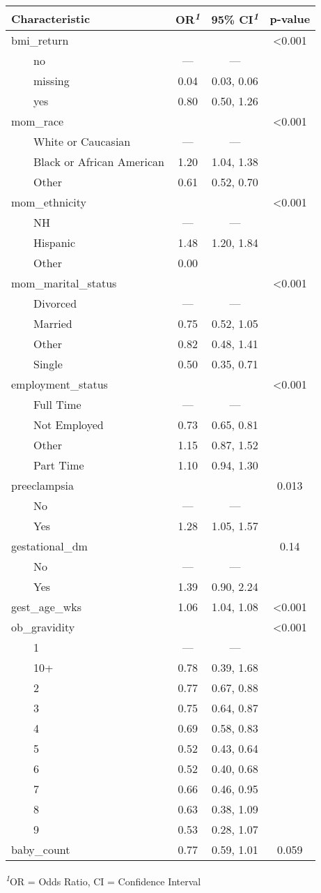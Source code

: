 \setlength{\LTpost}{0mm}
\begin{longtable}{lccc}
\toprule
\textbf{Characteristic} & \textbf{OR}\textsuperscript{\textit{1}} & \textbf{95\% CI}\textsuperscript{\textit{1}} & \textbf{p-value} \\ 
\midrule
bmi\_return &  &  & <0.001 \\ 
    no & — & — &  \\ 
    missing & 0.04 & 0.03, 0.06 &  \\ 
    yes & 0.80 & 0.50, 1.26 &  \\ 
mom\_race &  &  & <0.001 \\ 
    White or Caucasian & — & — &  \\ 
    Black or African American & 1.20 & 1.04, 1.38 &  \\ 
    Other & 0.61 & 0.52, 0.70 &  \\ 
mom\_ethnicity &  &  & <0.001 \\ 
    NH & — & — &  \\ 
    Hispanic & 1.48 & 1.20, 1.84 &  \\ 
    Other & 0.00 &  &  \\ 
mom\_marital\_status &  &  & <0.001 \\ 
    Divorced & — & — &  \\ 
    Married & 0.75 & 0.52, 1.05 &  \\ 
    Other & 0.82 & 0.48, 1.41 &  \\ 
    Single & 0.50 & 0.35, 0.71 &  \\ 
employment\_status &  &  & <0.001 \\ 
    Full Time & — & — &  \\ 
    Not Employed & 0.73 & 0.65, 0.81 &  \\ 
    Other & 1.15 & 0.87, 1.52 &  \\ 
    Part Time & 1.10 & 0.94, 1.30 &  \\ 
preeclampsia &  &  & 0.013 \\ 
    No & — & — &  \\ 
    Yes & 1.28 & 1.05, 1.57 &  \\ 
gestational\_dm &  &  & 0.14 \\ 
    No & — & — &  \\ 
    Yes & 1.39 & 0.90, 2.24 &  \\ 
gest\_age\_wks & 1.06 & 1.04, 1.08 & <0.001 \\ 
ob\_gravidity &  &  & <0.001 \\ 
    1 & — & — &  \\ 
    10+ & 0.78 & 0.39, 1.68 &  \\ 
    2 & 0.77 & 0.67, 0.88 &  \\ 
    3 & 0.75 & 0.64, 0.87 &  \\ 
    4 & 0.69 & 0.58, 0.83 &  \\ 
    5 & 0.52 & 0.43, 0.64 &  \\ 
    6 & 0.52 & 0.40, 0.68 &  \\ 
    7 & 0.66 & 0.46, 0.95 &  \\ 
    8 & 0.63 & 0.38, 1.09 &  \\ 
    9 & 0.53 & 0.28, 1.07 &  \\ 
baby\_count & 0.77 & 0.59, 1.01 & 0.059 \\ 
\bottomrule
\end{longtable}
\begin{minipage}{\linewidth}
\textsuperscript{\textit{1}}OR = Odds Ratio, CI = Confidence Interval\\
\end{minipage}

